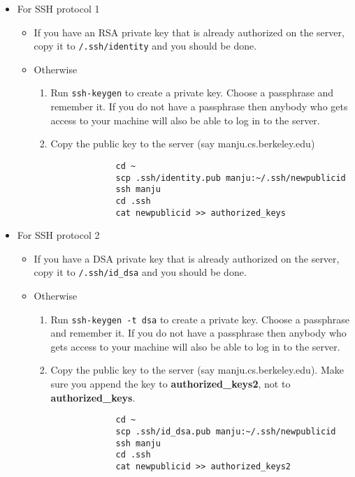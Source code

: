 \documentclass{article}
\def\t#1{{\tt #1}}
\begin{document}
\begin{itemize}
\item For SSH protocol 1
  \begin{itemize}
  \item If you have an RSA private key that is already authorized on 
        the server, copy it to \t{\home{}/.ssh/identity} and you 
        should be done.
  \item Otherwise
     \begin{enumerate}
       \item Run \t{ssh-keygen} to create a private key. 
        Choose a passphrase and
        remember it. If you do not have a passphrase then anybody who gets
        access to your machine will also be able to log in to the server.
       \item Copy the public key to the server (say manju.cs.berkeley.edu)
             \begin{verbatim}
             cd ~
             scp .ssh/identity.pub manju:~/.ssh/newpublicid
             ssh manju
             cd .ssh
             cat newpublicid >> authorized_keys
             \end{verbatim}
    \end{enumerate}
  \end{itemize}
 
\item For SSH protocol 2

  \begin{itemize}
  \item If you have a DSA private key that is already authorized on 
        the server, copy it to \t{\home{}/.ssh/id\_dsa} and you 
        should be done.
  \item Otherwise
     \begin{enumerate}
       \item Run \t{ssh-keygen -t dsa} to create a private key. 
        Choose a passphrase and remember it. 
        If you do not have a passphrase then anybody who gets
        access to your machine will also be able to log in to the server.
       \item Copy the public key to the server (say manju.cs.berkeley.edu).
          Make sure you append the key to {\bf authorized\_keys2}, not to {\bf
          authorized\_keys}.  
             \begin{verbatim}
             cd ~
             scp .ssh/id_dsa.pub manju:~/.ssh/newpublicid
             ssh manju
             cd .ssh
             cat newpublicid >> authorized_keys2
             \end{verbatim}
     \end{enumerate}
  \end{itemize}



\end{itemize}
\end{document}
